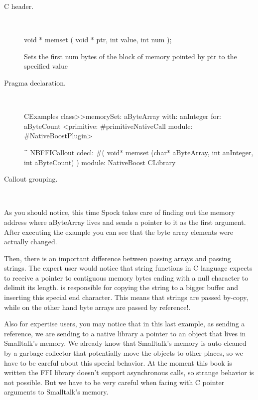\documentclass[a4paper,10pt,twoside]{book}
\begin{document}
\begin{description}
\item [C header.] \ 

\begin{code}{}
void * memset ( void * ptr, int value, int num );
\end{code}
Sets the first num bytes of the block of memory pointed by ptr to the specified value

\item [Pragma declaration.] \ 

\begin{code}{}
CExamples class>>memorySet: aByteArray with: anInteger for: aByteCount
	<primitive: #primitiveNativeCall module: #NativeBoostPlugin>
	
	^ NBFFICallout cdecl: #( void* memset (char* aByteArray, int anInteger, int aByteCount) ) module: NativeBoost CLibrary
\end{code}


\item [Callout grouping.] \ 
 

\end{description}

As you should notice, this time Spock takes care of finding out the memory address where aByteArray lives and sends a pointer to it as the first argument. After executing the example you can see that the byte array elements were actually changed. 

Then, there is an important difference between passing arrays and passing strings. The expert user would notice that string functions in C language expects to receive a pointer to contiguous memory bytes ending with a null character to delimit its length.  \Spock is responsible for copying the string to a bigger buffer and inserting this special end character. This means that strings are passed by-copy, while on the other hand byte arrays are passed by reference!.

Also for expertise users, you may notice that in this last example, as sending a reference, we are sending to a native library a pointer to an object that lives in Smalltalk's memory. We already know that Smalltalk's memory is auto cleaned by a garbage collector that potentially move the objects to other places, so we have to be careful about this special behavior. At the moment this book is written the FFI library doesn't support asynchronous calls, so strange behavior is not possible. But we have to be very careful when facing with C pointer arguments to Smalltalk's memory.
\end{document}
